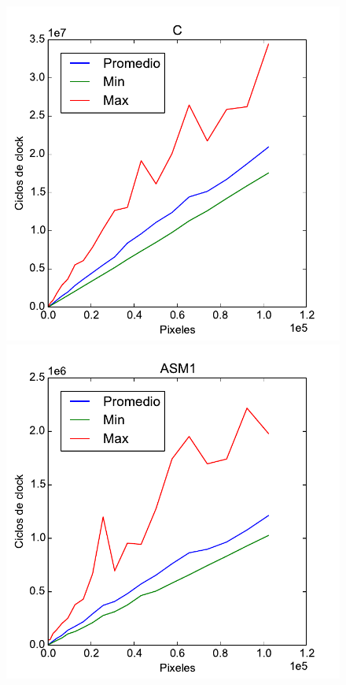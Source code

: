 \begin{figure}[h!]
	\centering
	\includegraphics[scale=0.45]{images/c_blur}
	\includegraphics[scale=0.45]{images/asm1_blur}

\end{figure}
